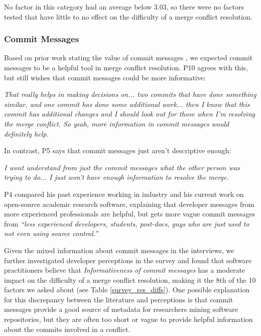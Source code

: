 No factor in this category had an average below 3.03, so there were no factors tested that have little to no effect on the difficulty of a merge conflict resolution.

\subsubsection{Commit Messages}
Based on prior work stating the value of commit messages \cite{yamauchi2014clustering} \cite{hindle2009automatic} \cite{cortes2014automatically} \cite{hattori2008nature}, we expected commit messages to be a helpful tool in merge conflict resolution. 
P10 agrees with this, but still wishes that commit messages could be more informative:
\begin{displayquote}
	\textit{That really helps in making decisions on... two commits that have done something similar, and one commit has done some additional work... then I know that this commit has additional changes and I should look out for those when I'm resolving the merge conflict. So yeah, more information in commit messages would definitely help.}
\end{displayquote}

In contrast, P5 says that commit messages just aren't descriptive enough:
\begin{displayquote}
\textit{I wont understand from just the commit messages what the other person was trying to do... I just won't have enough information to resolve the merge.}
\end{displayquote}

P4 compared his past experience working in industry and his current work on open-source academic research software, explaining that developer messages from more experienced professionals are helpful, but gets more vague commit messages from \textit{``less experienced developers, students, post-docs, guys who are just used to not even using source control.''}

Given the mixed information about commit messages in the interviews, we further investigated developer perceptions in the survey and found that software practitioners believe that \textit{Informativeness of commit messages} has a moderate impact on the difficulty of a merge conflict resolution, making it the 8th  of the 10 factors we asked about (see Table \ref{survey_res_diffs}). One possible explanation for this discrepancy between the literature and perceptions is that commit messages provide a good source of metadata for researchers mining software repositories, but they are often too short or vague to provide helpful information about the commits involved in a conflict.